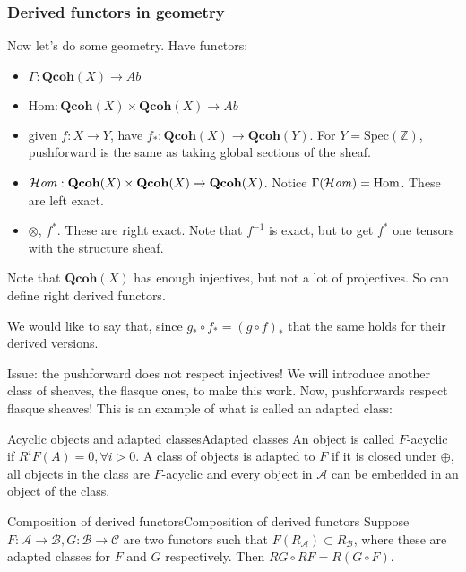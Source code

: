 \subsubsection{Derived functors in geometry}
Now let's do some geometry. Have functors: 

\begin{itemize}
    \item $\Gamma:\mathbf{Qcoh}(X)\xrightarrow{}Ab$
    \item $\mathrm{Hom}: \mathbf{Qcoh}(X)\times \mathbf{Qcoh}(X)\xrightarrow{ }Ab$
    \item given $f:X\xrightarrow{ }Y$, have $f_*:\mathbf{Qcoh}(X)\xrightarrow{}\mathbf{Qcoh}(Y)$. For $Y=\mathrm{Spec}(\mathbb{Z})$, pushforward is the same as taking global sections of the sheaf.
    \item $\operatorname{\mathcal{H}\mathit{om}}:\mathbf{Qcoh}(X)\times \mathbf{Qcoh}(X)\xrightarrow{} \mathbf{Qcoh}(X)$. Notice $\Gamma(\operatorname{\mathcal{H}\mathit{om}})=\mathrm{Hom}$. These are left exact.
    \item $\otimes$, $f^*$. These are right exact. Note that $f^{-1}$ is exact, but to get $f^*$ one tensors with the structure sheaf. 
\end{itemize}

Note that $\mathbf{Qcoh}(X)$ has enough injectives, but not a lot of projectives. So can define right derived functors.

We would like to say that, since $g_{*}\circ f_{*}=(g\circ f)_{*}$ that the same holds for their derived versions.

Issue: the pushforward does not respect injectives! We will introduce another class of sheaves, the flasque ones, to make this work. Now, pushforwards respect flasque sheaves! This is an example of what is called an adapted class:

\begin{definition}{Acyclic objects and adapted classes}{Adapted classes}
     An object is called $F$-acyclic if $R^iF(A)=0, \forall i>0$. A class of objects is adapted to $F$ if it is closed under $\oplus$, all objects in the class are $F$-acyclic and every object in $\mathcal{A}$ can be embedded in an object of the class.
        
\end{definition}

\begin{theorem}{Composition of derived functors}{Composition of derived functors}
    Suppose $F:\mathcal{A}\xrightarrow{}\mathcal{B}, G:\mathcal{B}\xrightarrow{}\mathcal{C}$ are two functors such that $F(R_{\mathcal{A}})\subset R_{\mathcal{B}}$, where these are adapted classes for $F$ and $G$ respectively. Then $RG\circ RF = R(G\circ F)$.
\end{theorem}

